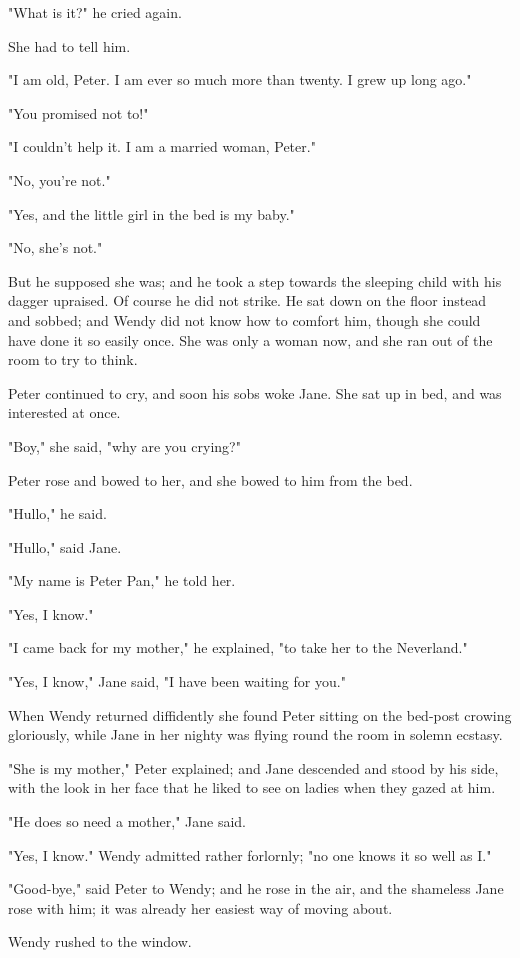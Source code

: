 "What is it?\@" he cried again.

She had to tell him.

"I am old, Peter.
I am ever so much more than twenty.
I grew up long ago."

"You promised not to!"

"I couldn't help it.
I am a married woman, Peter."

"No, you're not."

"Yes, and the little girl in the bed is my baby."

"No, she's not."

But he supposed she was;
and he took a step towards the sleeping child with his dagger upraised.
Of course he did not strike.
He sat down on the floor instead and sobbed;
and Wendy did not know how to comfort him,
though she could have done it so easily once.
She was only a woman now, and she ran out of the room to try to think.

Peter continued to cry, and soon his sobs woke Jane.
She sat up in bed, and was interested at once.

"Boy," she said, "why are you crying?"

Peter rose and bowed to her, and she bowed to him from the bed.

"Hullo," he said.

"Hullo," said Jane.

"My name is Peter Pan," he told her.

"Yes, I know."

"I came back for my mother," he explained,
"to take her to the Neverland."

"Yes, I know," Jane said, "I have been waiting for you."

When Wendy returned diffidently
she found Peter sitting on the bed-post crowing gloriously,
while Jane in her nighty was flying round the room in solemn ecstasy.

"She is my mother," Peter explained;
and Jane descended and stood by his side,
with the look in her face that he liked to see on ladies when they gazed at him.

"He does so need a mother," Jane said.

"Yes, I know."
Wendy admitted rather forlornly;
"no one knows it so well as I\@."

"Good-bye," said Peter to Wendy;
and he rose in the air, and the shameless Jane rose with him;
it was already her easiest way of moving about.

Wendy rushed to the window.

